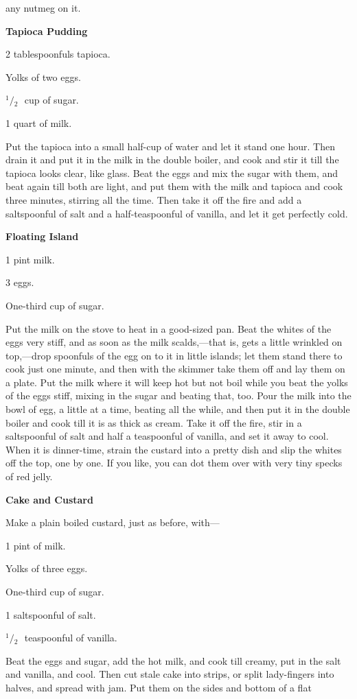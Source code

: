 \documentclass[11pt]{book}
\newcommand{\indpar}{\par\noindent\hspace*{\parindent}}
\newcommand{\ingredient}{\indpar}
\newcommand{\instruction}{\indpar}
\newcommand{\OneHalf}{\ensuremath{{}^1\!\!/\!{}_2\mbox{\ }}}
\newenvironment{RecipeTitle}{\medskip\begin{center}\large\bf }{\end{center}\smallskip}
\begin{document}
any nutmeg on it.
\begin{RecipeTitle}
Tapioca Pudding\label{tapioca_pudding}
\end{RecipeTitle}
\ingredient  2 tablespoonfuls tapioca.
\ingredient  Yolks of two eggs.
\ingredient  \OneHalf cup of sugar.
\ingredient  1 quart of milk.
\instruction  Put the tapioca into a small half-cup of water and let it
stand one hour.  Then drain it and put it in the milk in the
double boiler, and cook and stir it till the tapioca looks
clear, like glass.  Beat the eggs and mix the sugar with them,
and beat again till both are light, and put them with the milk
and tapioca and cook three minutes, stirring all the time.
Then take it off the fire and add a saltspoonful of salt and a
half-teaspoonful of vanilla, and let it get perfectly cold.
\begin{RecipeTitle}
Floating Island\label{floating_island}
\end{RecipeTitle}
\ingredient  1 pint milk.
\ingredient  3 eggs.
\ingredient  One-third cup of sugar.
\instruction  Put the milk on the stove to heat in a good-sized pan.  Beat
the whites of the eggs very stiff, and as soon as the milk
scalds,---that is, gets a little wrinkled on top,---drop
spoonfuls of the egg on to it in little islands; let them
stand there to cook just one minute, and then with the skimmer
take them off and lay them on a plate.  Put the milk where it
will keep hot but not boil while you beat the yolks of the
eggs stiff, mixing in the sugar and beating that, too.  Pour
the milk into the bowl of egg, a little at a time, beating all
the while, and then put it in the double boiler and cook till
it is as thick as cream.  Take it off the fire, stir in a
saltspoonful of salt and half a teaspoonful of vanilla, and
set it away to cool.  When it is dinner-time, strain the
custard into a pretty dish and slip the whites off the top,
one by one.  If you like, you can dot them over with very tiny
specks of red jelly.
\begin{RecipeTitle}
Cake and Custard\label{cake_and_custard}
\end{RecipeTitle}
\instruction  Make a plain boiled custard, just as before, with---
\ingredient  1 pint of milk.
\ingredient  Yolks of three eggs.
\ingredient  One-third cup of sugar.
\ingredient  1 saltspoonful of salt.
\ingredient  \OneHalf teaspoonful of vanilla.
\instruction  Beat the eggs and sugar, add the hot milk, and cook till
creamy, put in the salt and vanilla, and cool.  Then cut stale
cake into strips, or split lady-fingers into halves, and
spread with jam.  Put them on the sides and bottom of a flat
\end{document}

